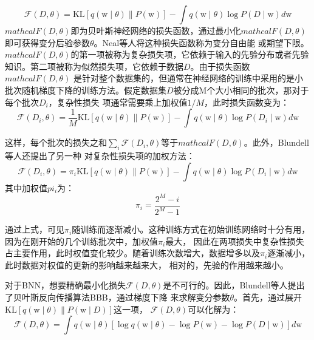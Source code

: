 \begin{equation}
	\label{}
	\mathcal{F}(D, \theta)=\mathrm{KL}[q(\mathrm{w} \mid \theta) \| P(\mathrm{w})]-\int q(\mathrm{w} \mid \theta) \log P(D \mid \mathrm{w}) d \mathrm{w}
\end{equation}
$mathcal{F}(D, \theta)$即为贝叶斯神经网络的损失函数，通过最小化$mathcal{F}(D, \theta)$即可获得变分后验参数$θ$。Neal等人\cite{neal1998view}将这种损失函数称为变分自由能\cite{friston2007variational}
或期望下限\cite{jaakkola2000bayesian}。$mathcal{F}(D, \theta)$的第一项被称为复杂损失项，它依赖于输入的先验分布或者先验知识。第二项被称为似然损失项，它依赖于数据$D$。由于损失函数$mathcal{F}(D, \theta)$
是针对整个数据集的，但通常在神经网络的训练中采用的是小批次随机梯度下降的训练方法。假定数据集$D$被分成M个大小相同的批次，那对于每个批次$D_i$，复杂性损失
项通常需要乘上加权值$1/M$，此时损失函数变为\cite{blundell2015weight}：
\begin{equation}
	\label{}
	\mathcal{F}\left(D_i, \theta\right)=\frac{1}{M} \mathrm{KL}[q(\mathrm{w} \mid \theta) \| P(\mathrm{w})]-\int q(\mathrm{w} \mid \theta) \log P\left(D_i \mid \mathrm{w}\right) d \mathrm{w}
\end{equation}

这样，每个批次的损失之和$\sum_{i}\mathcal{F}\left(D_i, \theta\right)$等于$mathcal{F}(D, \theta)$。此外，Blundell等人\cite{blundell2015weight}还提出了另一种
对复杂性损失项的加权方法：
\begin{equation}
	\label{}
	\mathcal{F}\left(D_i, \theta\right)=\pi_i \mathrm{KL}[q(\mathrm{w} \mid \theta) \| P(\mathrm{w})]-\int q(\mathrm{w} \mid \theta) \log P\left(D_i \mid \mathrm{w}\right) d \mathrm{w}
\end{equation}
其中加权值$pi_i$为：
\begin{equation}
	\label{}
	\pi_i = \frac{2^M-i}{2^M - 1}
\end{equation}

通过上式，可见$\pi_i$随训练而逐渐减小。这种训练方式在初始训练网络时十分有用，因为在刚开始的几个训练批次中，加权值$\pi_i$最大，
因此在两项损失中复杂性损失占主要作用，此时权值变化较少。随着训练次数增大，数据增多以及$\pi_i$逐渐减小，此时数据对权值的更新的影响越来越来大，
相对的，先验的作用越来越小。

对于BNN，想要精确最小化损失$\mathcal{F}(D, \theta)$是不可行的。因此，Blundell等人\cite{blundell2015weight}提出了贝叶斯反向传播算法BBB，通过梯度下降
来求解变分参数$\theta$。首先，通过展开$\mathrm{KL}[q(\mathrm{w} \mid \theta) \| P(\mathrm{w} \mid D)]$这一项，
$\mathcal{F}(D, \theta)$可以化解为：
\begin{equation}
	\label{kl_sandu}
	\mathcal{F}(D, \theta)=\int q(\mathrm{w} \mid \theta)[\log q(\mathrm{w} \mid \theta)-\log P(\mathrm{w})-\log P(D \mid \mathrm{w})] d \mathrm{w}
\end{equation}


